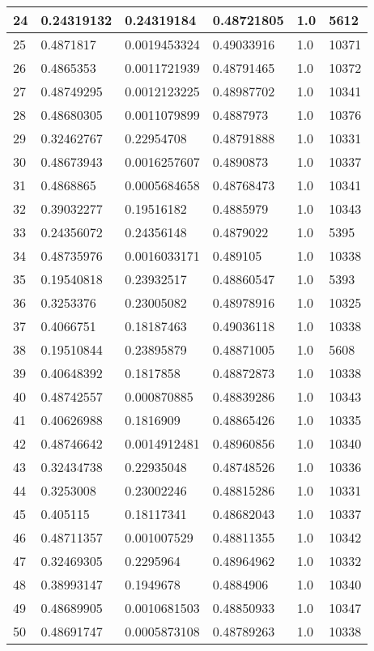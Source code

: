\begin{longtable}{|l|l|l|l|l|l|}
24 & 0.24319132 & 0.24319184 & 0.48721805 & 1.0 & 5612 \\ \hline 
25 & 0.4871817 & 0.0019453324 & 0.49033916 & 1.0 & 10371 \\ \hline 
26 & 0.4865353 & 0.0011721939 & 0.48791465 & 1.0 & 10372 \\ \hline 
27 & 0.48749295 & 0.0012123225 & 0.48987702 & 1.0 & 10341 \\ \hline 
28 & 0.48680305 & 0.0011079899 & 0.4887973 & 1.0 & 10376 \\ \hline 
29 & 0.32462767 & 0.22954708 & 0.48791888 & 1.0 & 10331 \\ \hline 
30 & 0.48673943 & 0.0016257607 & 0.4890873 & 1.0 & 10337 \\ \hline 
31 & 0.4868865 & 0.0005684658 & 0.48768473 & 1.0 & 10341 \\ \hline 
32 & 0.39032277 & 0.19516182 & 0.4885979 & 1.0 & 10343 \\ \hline 
33 & 0.24356072 & 0.24356148 & 0.4879022 & 1.0 & 5395 \\ \hline 
34 & 0.48735976 & 0.0016033171 & 0.489105 & 1.0 & 10338 \\ \hline 
35 & 0.19540818 & 0.23932517 & 0.48860547 & 1.0 & 5393 \\ \hline 
36 & 0.3253376 & 0.23005082 & 0.48978916 & 1.0 & 10325 \\ \hline 
37 & 0.4066751 & 0.18187463 & 0.49036118 & 1.0 & 10338 \\ \hline 
38 & 0.19510844 & 0.23895879 & 0.48871005 & 1.0 & 5608 \\ \hline 
39 & 0.40648392 & 0.1817858 & 0.48872873 & 1.0 & 10338 \\ \hline 
40 & 0.48742557 & 0.000870885 & 0.48839286 & 1.0 & 10343 \\ \hline 
41 & 0.40626988 & 0.1816909 & 0.48865426 & 1.0 & 10335 \\ \hline 
42 & 0.48746642 & 0.0014912481 & 0.48960856 & 1.0 & 10340 \\ \hline 
43 & 0.32434738 & 0.22935048 & 0.48748526 & 1.0 & 10336 \\ \hline 
44 & 0.3253008 & 0.23002246 & 0.48815286 & 1.0 & 10331 \\ \hline 
45 & 0.405115 & 0.18117341 & 0.48682043 & 1.0 & 10337 \\ \hline 
46 & 0.48711357 & 0.001007529 & 0.48811355 & 1.0 & 10342 \\ \hline 
47 & 0.32469305 & 0.2295964 & 0.48964962 & 1.0 & 10332 \\ \hline 
48 & 0.38993147 & 0.1949678 & 0.4884906 & 1.0 & 10340 \\ \hline 
49 & 0.48689905 & 0.0010681503 & 0.48850933 & 1.0 & 10347 \\ \hline 
50 & 0.48691747 & 0.0005873108 & 0.48789263 & 1.0 & 10338 \\ \hline 
\end{longtable}